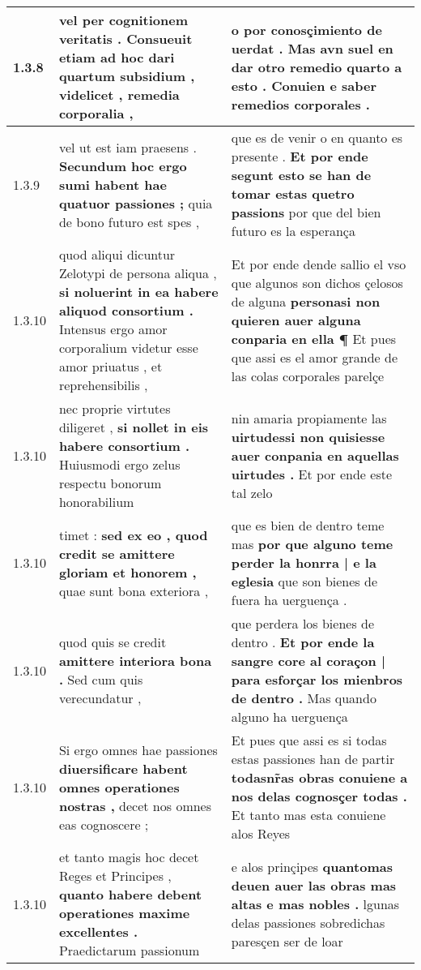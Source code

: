\begin{tabular}{|p{1cm}|p{6.5cm}|p{6.5cm}|}
1.3.8 & vel per cognitionem veritatis . \textbf{ Consueuit etiam ad hoc dari quartum subsidium , } videlicet , remedia corporalia , & o por conosçimiento de uerdat . \textbf{ Mas avn suel en dar otro remedio quarto a esto . } Conuien e saber remedios corporales . \\\hline
1.3.9 & vel ut est iam praesens . \textbf{ Secundum hoc ergo sumi habent hae quatuor passiones ; } quia de bono futuro est spes , & que es de venir o en quanto es presente . \textbf{ Et por ende segunt esto se han de tomar estas quetro passions } por que del bien futuro es la esperança \\\hline
1.3.10 & quod aliqui dicuntur Zelotypi de persona aliqua , \textbf{ si noluerint in ea habere aliquod consortium . } Intensus ergo amor corporalium videtur esse amor priuatus , et reprehensibilis , & Et por ende dende sallio el vso que algunos son dichos çelosos de alguna \textbf{ personasi non quieren auer alguna conparia en ella ¶ } Et pues que assi es el amor grande de las colas corporales parelçe \\\hline
1.3.10 & nec proprie virtutes diligeret , \textbf{ si nollet in eis habere consortium . } Huiusmodi ergo zelus respectu bonorum honorabilium & nin amaria propiamente las \textbf{ uirtudessi non quisiesse auer conpania en aquellas uirtudes . } Et por ende este tal zelo \\\hline
1.3.10 & timet : \textbf{ sed ex eo , quod credit se amittere gloriam et honorem , } quae sunt bona exteriora , & que es bien de dentro teme mas \textbf{ por que alguno teme perder la honrra | e la eglesia } que son bienes de fuera ha uerguença . \\\hline
1.3.10 & quod quis se credit \textbf{ amittere interiora bona . } Sed cum quis verecundatur , & que perdera los bienes de dentro . \textbf{ Et por ende la sangre core al coraçon | para esforçar los mienbros de dentro . } Mas quando alguno ha uerguença \\\hline
1.3.10 & Si ergo omnes hae passiones \textbf{ diuersificare habent omnes operationes nostras , } decet nos omnes eas cognoscere ; & Et pues que assi es si todas estas passiones han de partir \textbf{ todasnr̃as obras conuiene a nos delas cognosçer todas . } Et tanto mas esta conuiene alos Reyes \\\hline
1.3.10 & et tanto magis hoc decet Reges et Principes , \textbf{ quanto habere debent operationes maxime excellentes . } Praedictarum passionum & e alos prinçipes \textbf{ quantomas deuen auer las obras mas altas e mas nobles . } lgunas delas passiones sobredichas paresçen ser de loar \\\hline

\end{tabular}

